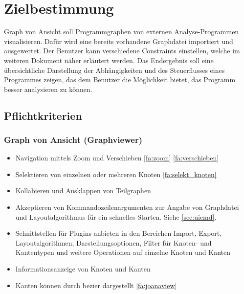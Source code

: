 \chapter{Zielbestimmung}

Graph von Ansicht soll Programmgraphen von externen Analyse-Programmen visualisieren. Dafür wird eine bereits vorhandene Graphdatei importiert und ausgewertet. Der Benutzer kann verschiedene Constraints einstellen, welche im weiteren Dokument näher erläutert werden.
Das Endergebnis soll eine übersichtliche Darstellung der Abhängigkeiten und des Steuerflusses eines Programmes zeigen, das dem Benutzer die Möglichkeit bietet, das Programm besser analysieren zu können.

\section{Pflichtkriterien}

\subsection{Graph von Ansicht (Graphviewer)}
  \begin{itemize}
    \item Navigation mittels Zoom und Verschieben \ref{fa:zoom} \ref{fa:verschieben}
    \item Selektieren von einzelnen oder mehreren Knoten \ref{fa:selekt_knoten}
    \item Kollabieren und Ausklappen von Teilgraphen %
    \item Akzeptieren von Kommandozeilenargumenten zur Angabe von Graphdatei und Layoutalgorithmus für ein schnelles Starten. Siehe \ref{sec:uicmd}.
    \item Schnittstellen für Plugins anbieten in den Bereichen Import, Export, Layoutalgorithmen, Darstellungsoptionen, Filter für Knoten- und Kantentypen und weitere Operationen auf einzelne Knoten und Kanten
    \item Informationsanzeige von Knoten und Kanten
    \item Kanten können durch \gls{bezier} dargestellt \ref{fa:joanaview}
  \end{itemize}
  
